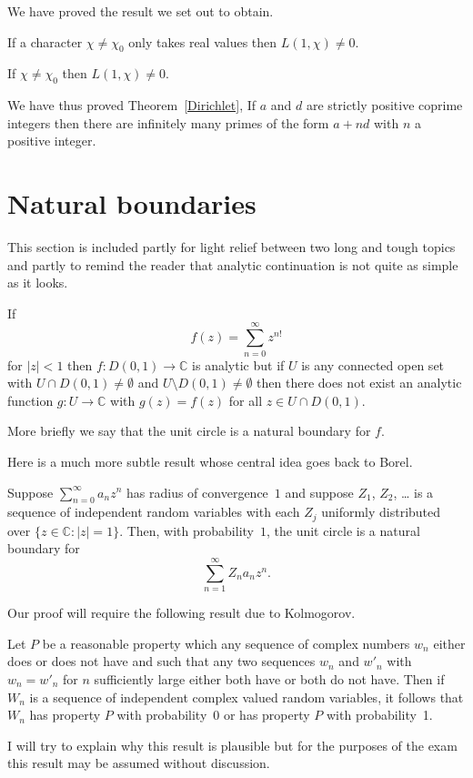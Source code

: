 We have proved the result we set out to obtain.
\begin{lemma} If a character $\chi\neq\chi_{0}$ 
only takes real values
then $L(1,\chi)\neq 0$.
\end{lemma}
\begin{theorem} If $\chi\neq\chi_{0}$ then $L(1,\chi)\neq 0$.
\end{theorem}
We have thus proved Theorem~\ref{Dirichlet}, 
If $a$ and $d$ are strictly
positive coprime integers then there are infinitely
many primes of the form $a+nd$ with $n$ a positive integer.

\section{Natural boundaries} This section is included
partly for light relief between two long and tough
topics and partly to remind the reader that analytic
continuation is not quite as simple as it looks.
\begin{lemma} If
\[f(z)=\sum_{n=0}^{\infty}z^{n!}\]
for $|z|<1$ then $f:D(0,1)\rightarrow{\mathbb C}$
is analytic but if $U$ is any connected open set with
$U\cap D(0,1)\neq\emptyset$ and $U\setminus D(0,1)\neq\emptyset$
then there does not exist an analytic function
$g:U\rightarrow{\mathbb C}$ with $g(z)=f(z)$ for all 
$z\in U\cap D(0,1)$.
\end{lemma}
More briefly we say that the unit circle is a natural boundary
for $f$.

Here is a much more subtle result whose central idea
goes back to Borel.
\begin{theorem}
Suppose $\sum_{n=0}^{\infty}a_{n}z^{n}$ has radius of 
convergence~$1$ and suppose  $Z_{1}$, $Z_{2}$, \dots
is a sequence of independent random variables with
each $Z_{j}$ uniformly distributed over 
$\{z\in{\mathbb C}:|z|=1\}$. Then, with probability~$1$,
the unit circle is a natural boundary
for
\[\sum_{n=1}^{\infty}Z_{n}a_{n}z^{n}.\]
\end{theorem}
Our proof will require the following result due to
Kolmogorov.
\begin{theorem}
Let $P$ be a reasonable property 
which any sequence of complex numbers $w_{n}$
either does or does not have and such that any
two sequences $w_{n}$ and $w'_{n}$ with $w_{n}=w'_{n}$
for $n$ sufficiently large either both have or
both do not have. Then if $W_{n}$ is a sequence
of independent complex valued random variables,
it follows that $W_{n}$  has property $P$ with
probability~0 or has property $P$ with
probability~1.
\end{theorem}
I will try to explain why this result is plausible
but for the purposes of the exam this result may be
assumed without discussion.

